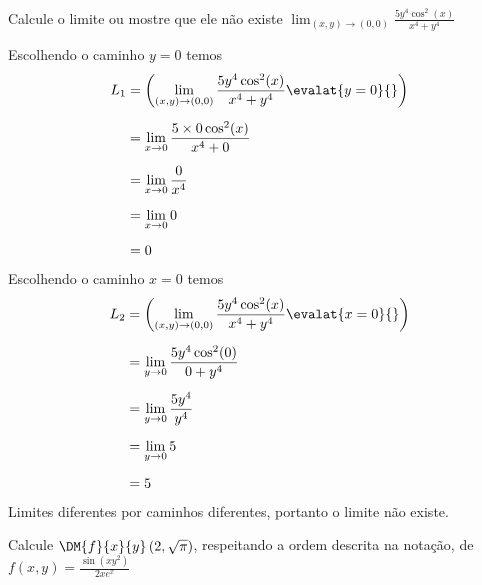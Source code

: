 \documentclass[a4paper,12pt,fleqn]{article}
\begin{document}

Calcule o limite ou mostre que ele não existe
\(
\lim_{(x, y)\to(0, 0)} \frac{5y^4\cos^2(x)}{x^4+y^4}
\)

\begin{answer}
  Escolhendo o caminho $y=0$ temos
  \begin{align*}
    L_1
    & = \left(\lim_{(x, y)\to(0, 0)} \frac{5y^4\cos^2(x)}{x^4+y^4} \evalat{y=0}{} \right) \\[2mm]
    & = \lim_{x\to 0} \frac{5\times0\cos^2(x)}{x^4+0} \\[2mm]
    & = \lim_{x\to 0} \frac{0}{x^4} \\[2mm]
    & = \lim_{x\to 0} 0 \\[2mm]
    & = 0
  \end{align*}
  Escolhendo o caminho $x=0$ temos
  \begin{align*}
    L_2
    & = \left(\lim_{(x, y)\to(0, 0)} \frac{5y^4\cos^2(x)}{x^4+y^4} \evalat{x=0}{} \right) \\[2mm]
    & = \lim_{y\to 0} \frac{5y^4\cos^2(0)}{0+y^4} \\[2mm]
    & = \lim_{y\to 0} \frac{5y^4}{y^4} \\[2mm]
    & = \lim_{y\to 0} 5 \\[2mm]
    & = 5
  \end{align*}
  Limites diferentes por caminhos diferentes, portanto o limite não existe.
\end{answer}

Calcule \(\DM{f}{x}{y}\left(2, \sqrt{\pi}\right)\)\!,
respeitando a ordem descrita na notação, de
\(
  f(x, y) = \frac{\sin\left(xy^2\right)}{2xe^x}
\)
\end{document}
